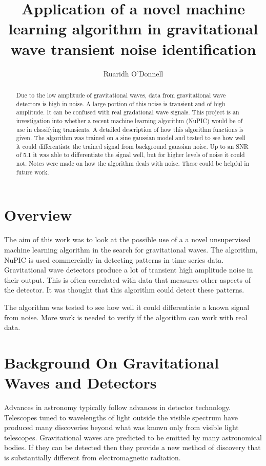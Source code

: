 \documentclass[a4paper]{jpconf}
\begin{document}
\title{Application of a novel machine learning algorithm in gravitational wave transient noise identification}
\author{Ruaridh O'Donnell}
\begin{abstract}
    Due to the low amplitude of gravitational waves, data from gravitational wave detectors is high in noise. A large portion of this noise is transient and of high amplitude. It can be confused with real gradational wave signals. This project is an investigation into whether a recent machine learning algorithm (NuPIC) would be of use in classifying transients. A detailed description of how this algorithm functions is given. The algorithm was trained on a sine gaussian model and tested to see how well it could differentiate the trained signal from background gaussian noise. Up to an SNR of 5.1 it was able to differentiate the signal well, but for higher levels of noise it could not. Notes were made on how the algorithm deals with noise. These could be helpful in future work.
\end{abstract}

\section{Overview}
	The aim of this work was to look at the possible use of a a novel unsupervised machine learning algorithm in the search for gravitational waves. The algorithm, NuPIC is used commercially in detecting patterns in time series data. Gravitational wave detectors produce a lot of transient high amplitude noise in their output. This is often correlated with data that measures other aspects of the detector. It was thought that this algorithm could detect these patterns.
	
	The algorithm was tested to see how well it could differentiate a known signal from noise. More work is needed to verify if the algorithm can work with real data.
    
\section{Background On Gravitational Waves and Detectors}
Advances in astronomy typically follow advances in detector technology. Telescopes tuned to wavelengths of light outside the visible spectrum have produced many discoveries beyond what was known only from visible light telescopes. Gravitational waves are predicted to be emitted by many astronomical bodies. If they can be detected then they provide a new method of discovery that is substantially different from electromagnetic radiation.
\end{document}
